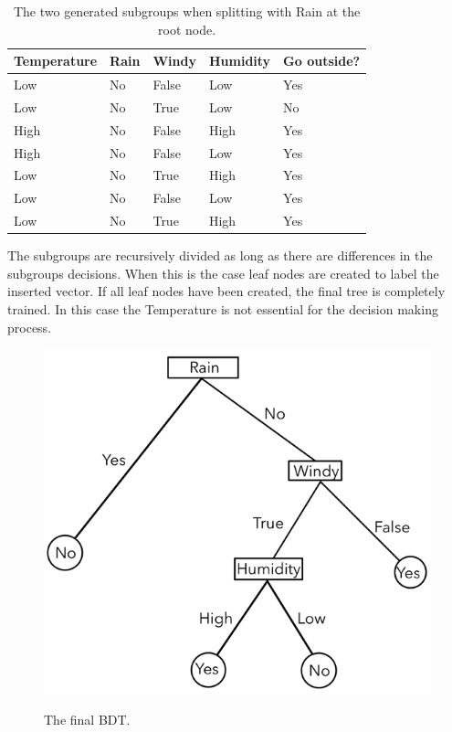 \documentclass[
12pt,
headsepline,
bibliography=totoc,
twoside=semi,
fleqn
]{scrartcl}
\begin{document}
   \begin{table}[H]
      \begin{tabular}{|l|l|l|l||l|}
      \hline
         Temperature & Rain & Windy & Humidity & Go outside? \\
       \hline
       \hline
      Low& No & False & Low & Yes \\
      \hline
      Low& No & True & Low & No \\
      \hline
      High& No & False &  High& Yes \\
      \hline
      High& No &  False&  Low& Yes \\
      \hline
      Low&  No& True & High &  Yes\\
      \hline
      Low&  No&  False& Low & Yes \\
      \hline
      Low&  No& True& High & Yes\\
      \hline
      \end{tabular}
      \label{fig:fig102}
      \caption{The two generated subgroups when splitting with Rain at the root node.}
      \end{table}

 The subgroups are recursively divided as long as there are differences in the subgroups decisions. When this is the case leaf nodes are created to label the inserted vector. If all leaf nodes have been created, the final tree is completely trained. In this case the Temperature is not essential for the decision making process.

 
 \begin{figure}[H]
    \centering\includegraphics[scale=0.55]{BDT11.png}\label{fig:fig11}
    \caption{The final BDT.} 
 \end{figure}
\end{document}
